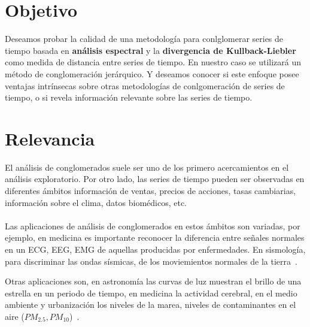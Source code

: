 \documentclass[12pt,oneside]{book}
\begin{document}
\section{Objetivo}
Deseamos probar la calidad de una metodolog\'ia para conlglomerar series de tiempo basada en \textbf{an\'alisis espectral} y la \textbf{divergencia de Kullback-Liebler} como medida de distancia entre series de tiempo. En nuestro caso se utilizar\'a un m\'etodo de conglomeraci\'on jer\'arquico. Y deseamos conocer si este enfoque posee ventajas intr\'insecas sobre otras metodolog\'ias de conlgomeraci\'on de series de tiempo, o si revela informaci\'on relevante sobre las series de tiempo.
\section{Relevancia}
El an\'alisis de conglomerados suele ser uno de los primero acercamientos en el an\'alisis exploratorio. Por otro lado, las series de tiempo pueden ser observadas en diferentes \'ambitos informaci\'on de ventas, precios de acciones, tasas cambiarias, informaci\'on sobre el clima, datos biom\'edicos, etc. ~\cite{TimeSeries}\\\\
Las aplicaciones de an\'alisis de conglomerados en estos \'ambitos son variadas, por ejemplo, en medicina es importante reconocer la diferencia entre se\~nales normales en un ECG, EEG, EMG de aquellas producidas por enfermedades. En sismolog\'ia, para discriminar las ondas s\'ismicas, de los moviemientos normales de la tierra~\cite{TimeSeries2}. 

Otras aplicaciones son, en astronom\'ia las curvas de luz muestran el brillo de una estrella en un periodo de tiempo, en medicina la actividad cerebral, en el medio ambiente y urbanizaci\'on los niveles de la marea, niveles de contaminantes en el aire ($PM_{2.5}, PM_{10}$)~\cite{TimeSeries}.
\end{document}
